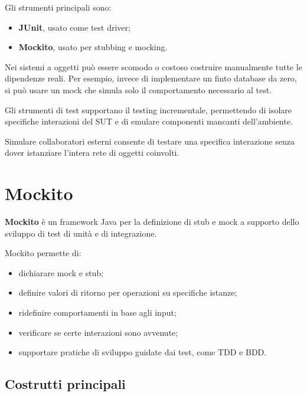 Gli strumenti principali sono:

\begin{itemize}
    \item \textbf{JUnit}, usato come test driver;
    \item \textbf{Mockito}, usato per stubbing e mocking.
\end{itemize}

\begin{notaprof}
Nei sistemi a oggetti può essere scomodo o costoso costruire manualmente tutte le dipendenze reali. Per esempio, invece di implementare un finto database da zero, si può usare un mock che simula solo il comportamento necessario al test.
\end{notaprof}

\begin{notaslide}
Gli strumenti di test supportano il testing incrementale, permettendo di isolare specifiche interazioni del SUT e di emulare componenti mancanti dell'ambiente.
\end{notaslide}

Simulare collaboratori esterni consente di testare una specifica interazione senza dover istanziare l'intera rete di oggetti coinvolti.

\section{Mockito}

\textbf{Mockito} è un framework Java per la definizione di stub e mock a supporto dello sviluppo di test di unità e di integrazione.

Mockito permette di:

\begin{itemize}
    \item dichiarare mock e stub;
    \item definire valori di ritorno per operazioni su specifiche istanze;
    \item ridefinire comportamenti in base agli input;
    \item verificare se certe interazioni sono avvenute;
    \item supportare pratiche di sviluppo guidate dai test, come TDD e BDD.
\end{itemize}

\subsection{Costrutti principali}

